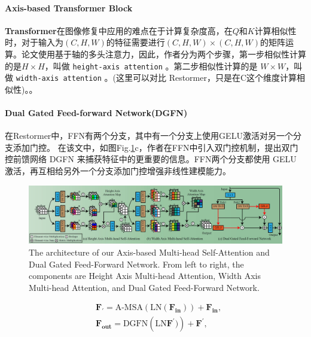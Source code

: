 \documentclass[letterpaper,10pt]{article}
\begin{document}
	\paragraph{Axis-based Transformer Block}
	
	\textbf{Transformer}在图像修复中应用的难点在于计算复杂度高，在$Q$和$K$计算相似性时，对于输入为$(C,H,W)$的特征需要进行$(C,H,W) \times (C,H,W)$的矩阵运算。论文使用基于轴的多头注意力，因此，作者分为两个步骤，第一步相似性计算的是$H \times H$，叫做 \texttt{height-axis attention} 。第二步相似性计算的是 $W \times W$，叫做 \texttt{width-axis attention} 。(这里可以对比 Restormer，只是在C这个维度计算相似性)。。
	
	\paragraph{Dual Gated Feed-forward Network(DGFN)}
	
	在Restormer中，FFN有两个分支，其中有一个分支上使用GELU激活对另一个分支添加门控。
	在该文中，如图Fig.\ref{fig: Axis-based Transformer Block & Dual Gated Feed-forward Network(GDFN)}c，作者在FFN中引入双门控机制，提出双门控前馈网络 DGFN 来捕获特征中的更重要的信息。FFN两个分支都使用 GELU 激活，再互相给另外一个分支添加门控增强非线性建模能力。
	
	\begin{figure}[htbp]
		\centering 
		\includegraphics[width=\columnwidth]{picture/Axis_based_Transformer_Block_&_Dual_Gated_Feed-forward_Network(GDFN)}
		\captionsetup{font=scriptsize}
		\caption{
			\label{fig: Axis-based Transformer Block & Dual Gated Feed-forward Network(GDFN)} %
			The architecture of our Axis-based Multi-head Self-Attention and Dual Gated Feed-Forward Network. From left to right, the components are Height Axis Multi-head Attention, Width Axis Multi-head Attention, and Dual Gated Feed-Forward Network.
		}
	\end{figure}
	
	\begin{equation}
		\begin{aligned}
			& \mathbf{F}_\prime = \text{A-MSA} \left(\text{LN}(\textbf{F}_\textbf{in})\right) + \mathbf{F}_\mathbf{in}, \\
			& \mathbf{F}_\mathbf{out} = \text{DGFN} \left(\text{LN}\mathbf{F}^\prime)\right) + \mathbf{F}^\prime,
		\end{aligned}
		\label{eq: FFN}
	\end{equation}
	
\end{document}
